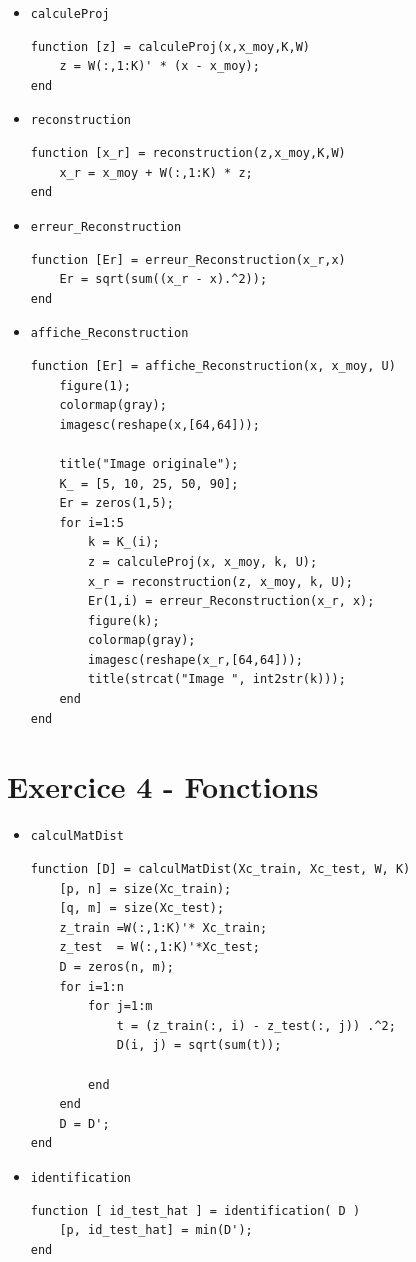 \documentclass[a4paper]{article}
\begin{document}
\begin{itemize}
    \item \texttt{calculeProj}
\begin{lstlisting}[frame=single]
function [z] = calculeProj(x,x_moy,K,W)
    z = W(:,1:K)' * (x - x_moy);
end
\end{lstlisting}

\item \texttt{reconstruction}

\begin{lstlisting}[frame=single]
function [x_r] = reconstruction(z,x_moy,K,W)
    x_r = x_moy + W(:,1:K) * z;
end
\end{lstlisting}

\item \texttt{erreur\_Reconstruction}

\begin{lstlisting}[frame=single]
function [Er] = erreur_Reconstruction(x_r,x)
    Er = sqrt(sum((x_r - x).^2));
end
\end{lstlisting}

\item \texttt{affiche\_Reconstruction}

\begin{lstlisting}[frame=single]
function [Er] = affiche_Reconstruction(x, x_moy, U)
    figure(1);
    colormap(gray);
    imagesc(reshape(x,[64,64]));
    
    title("Image originale");
    K_ = [5, 10, 25, 50, 90];
    Er = zeros(1,5);
    for i=1:5
        k = K_(i);
        z = calculeProj(x, x_moy, k, U);
        x_r = reconstruction(z, x_moy, k, U);
        Er(1,i) = erreur_Reconstruction(x_r, x);
        figure(k);
        colormap(gray);
        imagesc(reshape(x_r,[64,64]));
        title(strcat("Image ", int2str(k)));
    end
end

\end{lstlisting}
\end{itemize}

\section{Exercice 4 - Fonctions}
\label{appendix:ex4}

\begin{itemize}
    \item \texttt{calculMatDist}
\begin{lstlisting}[frame=single]
function [D] = calculMatDist(Xc_train, Xc_test, W, K)
    [p, n] = size(Xc_train);
    [q, m] = size(Xc_test);
    z_train =W(:,1:K)'* Xc_train;
    z_test  = W(:,1:K)'*Xc_test;
    D = zeros(n, m);
    for i=1:n
        for j=1:m
            t = (z_train(:, i) - z_test(:, j)) .^2;
            D(i, j) = sqrt(sum(t));
    
        end
    end
    D = D'; 
end
\end{lstlisting}

\item \texttt{identification}
\begin{lstlisting}[frame=single]
function [ id_test_hat ] = identification( D )
    [p, id_test_hat] = min(D'); 
end
\end{lstlisting}
\end{itemize}
\end{document}
